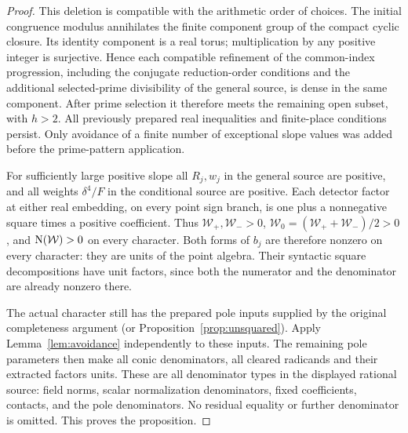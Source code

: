 \documentclass[11pt,a4paper]{article}
\theoremstyle{remark}\newtheorem{remark}[theorem]{Remark}
\begin{document}
\begin{proof}
This deletion is compatible with the arithmetic order of choices.
The initial congruence modulus annihilates the finite component group
of the compact cyclic closure. Its identity component is a real torus;
multiplication by any positive integer is surjective. Hence each
compatible refinement of the common-index progression, including the
conjugate reduction-order conditions and the additional selected-prime
divisibility of the general source, is dense in the same component.
After prime selection it therefore meets the remaining open subset,
with $h>2$. All previously prepared real inequalities and finite-place
conditions persist. Only avoidance of a finite number of exceptional
slope values was added before the prime-pattern application.

For sufficiently large positive slope all $R_j,w_j$ in the general
source are positive, and all weights $\delta^4/F$ in the conditional
source are positive. Each detector factor at either real embedding,
on every point sign branch, is one plus a nonnegative square times a
positive coefficient. Thus $\mathcal W_+,\mathcal W_->0$,
$\mathcal W_0=(\mathcal W_++\mathcal W_-)/2>0$, and
$\operatorname{N}(\mathcal W)>0$ on every character. Both forms of $b_j$ are therefore
nonzero on every character: they are units of the point algebra.
Their syntactic square decompositions have unit factors, since both
the numerator and the denominator are already nonzero there.

The actual character still has the prepared pole inputs supplied by the
original completeness argument (or Proposition~\ref{prop:unsquared}).
Apply Lemma~\ref{lem:avoidance} independently to these inputs. The
remaining pole parameters then make all conic denominators, all cleared
radicands and their extracted factors units. These are all denominator
types in the displayed rational source: field norms, scalar normalization
denominators, fixed coefficients, contacts, and the pole denominators.
No residual equality or further denominator is omitted. This proves the
proposition.
\end{proof}
\end{document}
